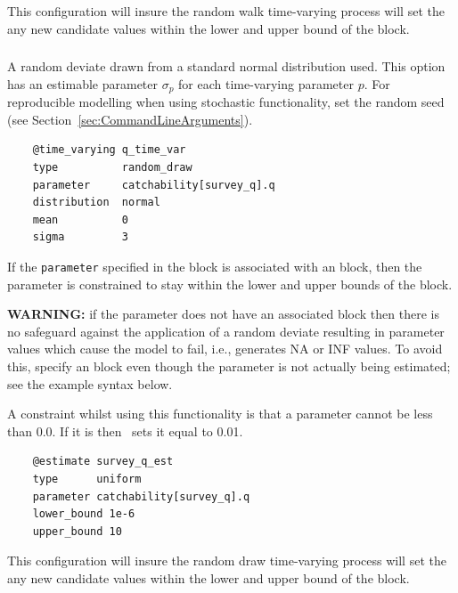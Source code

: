 This configuration will insure the random walk time-varying process will set the any new candidate values within the lower and upper bound of the  block.

\subsubsection[Random draw]{}\label{sec:TimeVarying-RandomDraw}

A random deviate drawn from a standard normal distribution used. This option has an estimable parameter $\sigma_p$ for each time-varying parameter $p$. For reproducible modelling when using stochastic functionality, set the random seed (see Section~\ref{sec:CommandLineArguments}).

{\small{\begin{verbatim}
	@time_varying q_time_var
	type          random_draw
	parameter     catchability[survey_q].q
	distribution  normal
	mean          0
	sigma         3
\end{verbatim}}}

If the \texttt{parameter} specified in the  block is associated with an  block, then the parameter is constrained to stay within the lower and upper bounds of the  block.

\textbf{WARNING:} if the parameter does not have an associated  block then there is no safeguard against the application of a random deviate resulting in parameter values which cause the model to fail, i.e., generates NA or INF values. To avoid this, specify an  block even though the parameter is not actually being estimated; see the example syntax below.

A constraint whilst using this functionality is that a parameter cannot be less than 0.0. If it is then \CNAME\ sets it equal to 0.01.

{\small{\begin{verbatim}
	@estimate survey_q_est
	type      uniform
	parameter catchability[survey_q].q
	lower_bound 1e-6
	upper_bound 10
\end{verbatim}}}

This configuration will insure the random draw time-varying process will set the any new candidate values within the lower and upper bound of the  block.

\subsection{\label{sec:eq_parser}} 

